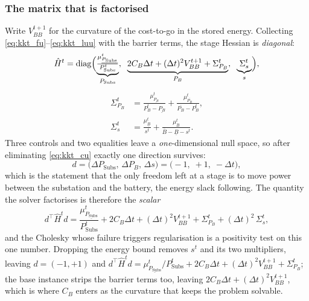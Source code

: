 \subsubsection{The matrix that is factorised}
Write $V_{BB}^{t+1}$ for the curvature of the cost-to-go in the stored energy.
Collecting \eqref{eq:kkt_fu}--\eqref{eq:kkt_luu} with the barrier terms, the
stage Hessian is \emph{diagonal}:
\begin{equation}
\hat{H}^t = \operatorname{diag}\Bigl(
  \underbrace{\tfrac{\mu_{\underline{P_{\mathrm{Subs}}}}^t}{P_{\text{Subs}}^t}}_{P_{\text{Subs}}},\;\;
  \underbrace{2 C_B \Delta t + (\Delta t)^2 V_{BB}^{t+1} + \Sigma_{P_B}^t}_{P_B},\;\;
  \underbrace{\Sigma_{s}^t}_{s}
\Bigr),
\label{eq:kkt_H}
\end{equation}
\begin{align}
\Sigma_{P_B}^t &= \frac{\mu_{\underline{P_B}}^t}{P_B^t - \underline{P_B}}
                + \frac{\mu_{\overline{P_B}}^t}{\overline{P_B} - P_B^t},
\label{eq:kkt_sigma_pb} \\
\Sigma_{s}^t   &= \frac{\mu_{\underline B}^t}{s^t}
                + \frac{\mu_{\overline B}^t}{\overline B - \underline B - s^t} .
\label{eq:kkt_sigma_s}
\end{align}
Three controls and two equalities leave a \emph{one}-dimensional null space, so
after eliminating \eqref{eq:kkt_cu} exactly one direction survives:
\begin{equation}
d = \bigl(\Delta P_{\text{Subs}},\, \Delta P_B,\, \Delta s\bigr)
  = \bigl(-1,\; +1,\; -\Delta t\bigr) ,
\label{eq:kkt_null}
\end{equation}
which is the statement that the only freedom left at a stage is to move power
between the substation and the battery, the energy slack following.  The
quantity the solver factorises is therefore the \emph{scalar}
\begin{equation}
d^\top \hat{H}^t d
 = \frac{\mu_{\underline{P_{\mathrm{Subs}}}}^t}{P_{\text{Subs}}^t}
 + 2 C_B \Delta t + (\Delta t)^2 V_{BB}^{t+1}
 + \Sigma_{P_B}^t + (\Delta t)^2\, \Sigma_{s}^t ,
\label{eq:kkt_reduced}
\end{equation}
and the Cholesky whose failure triggers regularisation is a positivity test on
this one number.  Dropping the energy bound removes $s^t$ and its two
multipliers, leaving $d = (-1, +1)$ and
$d^\top \hat{H}^t d = \mu_{\underline{P_{\mathrm{Subs}}}}^t / P_{\text{Subs}}^t + 2 C_B \Delta t
+ (\Delta t)^2 V_{BB}^{t+1} + \Sigma_{P_B}^t$; the base instance strips the
barrier terms too, leaving $2 C_B \Delta t + (\Delta t)^2 V_{BB}^{t+1}$, which is
where $C_B$ enters as the curvature that keeps the problem solvable.

